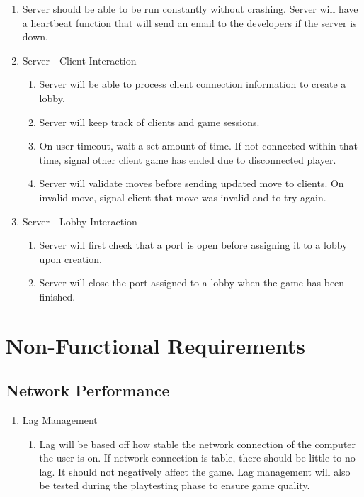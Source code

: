 \documentclass[10pt]{article}
\begin{document}
\begin{enumerate}[resume*]
    \item Server should be able to be run constantly without crashing.
        \subitem Server will have a heartbeat function that will send an email to the developers if the server is down.
    \item Server - Client Interaction
    \begin{enumerate}[label*=\arabic*.]
        \item Server will be able to process client connection information to create a lobby.
        \item Server will keep track of clients and game sessions.
        \item On user timeout, wait a set amount of time.
            \subitem If not connected within that time, signal other client game has ended due to disconnected player.
        \item Server will validate moves before sending updated move to clients.
            \subitem On invalid move, signal client that move was invalid and to try again.
    \end{enumerate}
    \item Server - Lobby Interaction
    \begin{enumerate}[label*=\arabic*.]
        \item Server will first check that a port is open before assigning it to a lobby upon creation.
        \item Server will close the port assigned to a lobby when the game has been finished.
    \end{enumerate}
\end{enumerate}

\section{Non-Functional Requirements}

\subsection{Network Performance}

\begin{enumerate}[label*=N\arabic*.]
    \item Lag Management
	 \begin{enumerate}[label*=\arabic*.]
        \item Lag will be based off how stable the network connection of the computer the user is on. If network connection is table, there should be little to no lag. It should not negatively affect the game. Lag management will also be tested during the playtesting phase to ensure game quality.
	  \end{enumerate}
\end{enumerate}
\end{document}
